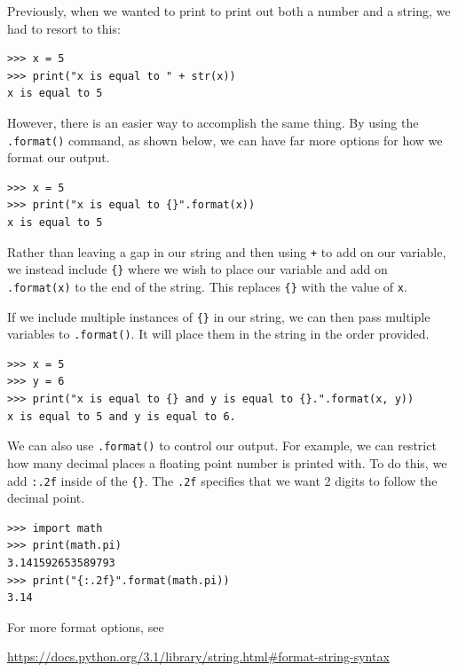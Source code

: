 \documentclass[11pt]{cselabheader}
\begin{document}
Previously, when we wanted to print to print out both a number and a string, we
had to resort to this:
\begin{lstlisting}[style=ipython]
>>> x = 5
>>> print("x is equal to " + str(x))
x is equal to 5
\end{lstlisting}

However, there is an easier way to accomplish the same thing. By using the
\lstinline!.format()! command, as shown below, we can have far more options for
how we format our output.

\begin{lstlisting}[style=ipython]
>>> x = 5
>>> print("x is equal to {}".format(x))
x is equal to 5
\end{lstlisting}

Rather than leaving a gap in our string and then using \lstinline{+} to add on
our variable, we instead include \lstinline!{}! where we wish to place our
variable and add on \lstinline{.format(x)} to the end of the string. This
replaces \lstinline!{}! with the value of \lstinline{x}.

If we include multiple instances of \lstinline!{}! in our string, we can then
pass multiple variables to \lstinline{.format()}. It will place them in the
string in the order provided.

\begin{lstlisting}[style=ipython]
>>> x = 5
>>> y = 6
>>> print("x is equal to {} and y is equal to {}.".format(x, y))
x is equal to 5 and y is equal to 6.
\end{lstlisting}

We can also use \lstinline!.format()! to control our output. For example, we can
restrict how many decimal places a floating point number is printed with. To do
this, we add \lstinline{:.2f} inside of the \lstinline!{}!. The \lstinline{.2f}
specifies that we want 2 digits to follow the decimal point. 

\begin{lstlisting}[style=ipython]
>>> import math
>>> print(math.pi)
3.141592653589793
>>> print("{:.2f}".format(math.pi))
3.14
\end{lstlisting}

For more format options, see
\begin{center}
  \vspace{-2mm}
\url{https://docs.python.org/3.1/library/string.html#format-string-syntax}
\vspace{-2mm}

\end{center}
\end{document}
